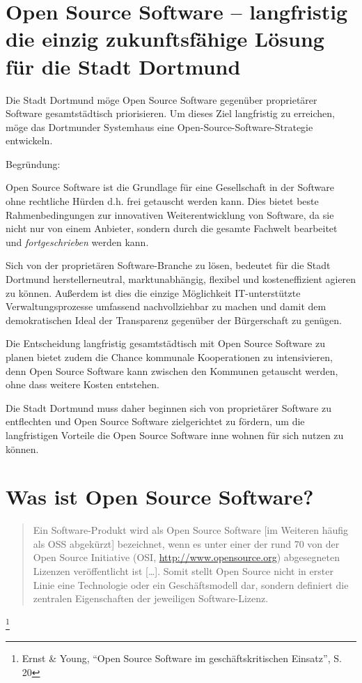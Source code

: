 \documentclass[a4paper]{scrartcl}
\begin{document}
\section{Open Source Software -- langfristig die einzig zukunftsfähige Lösung für die Stadt
Dortmund}

Die Stadt Dortmund möge Open Source Software gegenüber proprietärer Software
gesamtstädtisch priorisieren. Um dieses Ziel langfristig zu erreichen, möge das
Dortmunder Systemhaus eine Open-Source-Software-Strategie entwickeln.

Begründung:

Open Source Software ist die Grundlage für eine Gesellschaft in der Software
ohne rechtliche Hürden d.h. frei getauscht werden kann. Dies bietet beste
Rahmenbedingungen zur innovativen Weiterentwicklung von Software, da sie nicht
nur von einem Anbieter, sondern durch die gesamte Fachwelt bearbeitet und
\emph{fortgeschrieben} werden kann.

Sich von der proprietären Software-Branche zu lösen, bedeutet für die Stadt
Dortmund herstellerneutral, marktunabhängig, flexibel und kosteneffizient
agieren zu können. Außerdem ist dies die einzige Möglichkeit IT-unterstützte
Verwaltungsprozesse umfassend nachvollziehbar zu machen und damit dem
demokratischen Ideal der Transparenz gegenüber der Bürgerschaft zu genügen.

Die Entscheidung langfristig gesamtstädtisch mit Open Source Software zu planen
bietet zudem die Chance kommunale Kooperationen zu intensivieren, denn Open
Source Software kann zwischen den Kommunen getauscht werden, ohne dass weitere
Kosten entstehen.

Die Stadt Dortmund muss daher beginnen sich von proprietärer Software zu
entflechten und Open Source Software zielgerichtet zu fördern, um die
langfristigen Vorteile die Open Source Software inne wohnen für sich nutzen zu
können.

\section{Was ist Open Source Software?}

\begin{quote}Ein Software-Produkt wird als Open Source Software [im Weiteren
  häufig als OSS abgekürzt] bezeichnet, wenn es unter einer der rund 70 von der
  Open Source Initiative (OSI,
  \href{http://www.opensource.org/}{{http://www.opensource.org}}) abgesegneten
  Lizenzen veröffentlicht ist [\ldots]. Somit stellt Open Source nicht in erster
  Linie eine Technologie oder ein Geschäftsmodell dar, sondern definiert die
  zentralen Eigenschaften der jeweiligen Software-Lizenz.
\end{quote}\footnote{Ernst \& Young, ``Open Source Software im
  geschäftskritischen Einsatz'', S. 20}
\end{document}
